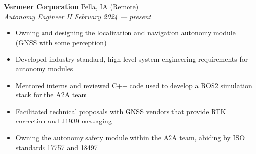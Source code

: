 \documentclass[a4paper]{article}
\begin{document}
\textbf{Vermeer Corporation} \hfill Pella, IA (Remote)\\
\textit{Autonomy Engineer II} \hfill \textit{February 2024 --- present}\\
\vspace{-1mm}
\begin{itemize}
    \item Owning and designing the localization and navigation autonomy module (GNSS with some perception)
    \item Developed industry-standard, high-level system engineering requirements for autonomy modules
    \item Mentored interns and reviewed C++ code used to develop a ROS2 simulation stack for the A2A team
    \item Facilitated technical proposals with GNSS vendors that provide RTK correction and J1939 messaging
    \item Owning the autonomy safety module within the A2A team, abiding by ISO standards 17757 and 18497
\end{itemize}
\end{document}
